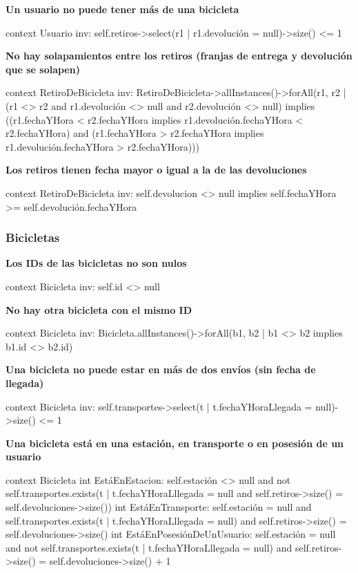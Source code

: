 \documentclass[a4paper, 10pt, twoside]{article}
\newenvironment{ocl}[1]
  {
    \textbf{#1}
    \verbatim
  }{
    \endverbatim
  }
\begin{document}
\begin{ocl}{Un usuario no puede tener más de una bicicleta}
  context Usuario
  inv: self.retiros->select(r1 | r1.devolución = null)->size() <= 1
\end{ocl}

\begin{ocl}{No hay solapamientos entre los retiros (franjas de entrega y devolución que se solapen)}
  context RetiroDeBicicleta
  inv: RetiroDeBicicleta->allInstances()->forAll(r1, r2 |
           (r1 <> r2 and r1.devolución <> null and r2.devolución <> null) implies
               ((r1.fechaYHora < r2.fechaYHora implies
                   r1.devolución.fechaYHora < r2.fechaYHora) and
                (r1.fechaYHora > r2.fechaYHora implies
                   r1.devolución.fechaYHora > r2.fechaYHora)))
\end{ocl}

\begin{ocl}{Los retiros tienen fecha mayor o igual a la de las devoluciones}
  context RetiroDeBicicleta
  inv: self.devolucion <> null implies self.fechaYHora >= self.devolución.fechaYHora
\end{ocl}


\subsubsection{Bicicletas}

\begin{ocl}{Los IDs de las bicicletas no son nulos}
  context Bicicleta
  inv: self.id <> null
\end{ocl}

\begin{ocl}{No hay otra bicicleta con el mismo ID}
  context Bicicleta
  inv: Bicicleta.allInstances()->forAll(b1, b2 | b1 <> b2 implies b1.id <> b2.id)
\end{ocl}

\begin{ocl}{Una bicicleta no puede estar en más de dos envíos (sin fecha de llegada)}
  context Bicicleta
  inv: self.transportes->select(t | t.fechaYHoraLlegada = null)->size() <= 1
\end{ocl}

\begin{ocl}{Una bicicleta está en una estación, en transporte o en posesión de un usuario}
  context Bicicleta
  int EstáEnEstacion: self.estación <> null and
                      not self.transportes.exists(t |
                          t.fechaYHoraLllegada = null and
                          self.retiros->size() = self.devoluciones->size())
  int EstáEnTransporte: self.estación = null and
                        self.transportes.exists(t | t.fechaYHoraLllegada = null) and
                        self.retiros->size() = self.devoluciones->size()
  int EstáEnPosesiónDeUnUsuario: self.estación = null and
                                 not self.transportes.exists(t |
                                     t.fechaYHoraLllegada = null) and
                                 self.retiros->size() = self.devoluciones->size() + 1
\end{ocl}
\end{document}
